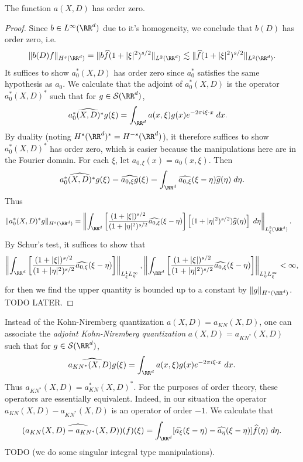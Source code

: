 \begin{theorem}
  The function $a(X,D)$ has order zero.
\end{theorem}
\begin{proof}
  Since $b \in L^\infty(\RR^d)$ due to it's homogeneity, we conclude that $b(D)$ has order zero, i.e.
  \[ \| b(D) f \|_{H^s(\RR^d)} = \| b \widehat{f} (1 + |\xi|^2)^{s/2} \|_{L^2(\RR^d)} \lesssim \| \widehat{f} (1 + |\xi|^2)^{s/2} \|_{L^2(\RR^d)}. \]
  It suffices to show $a_0^*(X,D)$ has order zero since $a_0^*$ satisfies the same hypothesis as $a_0$. We calculate that the adjoint of $a_0^*(X,D)$ is the operator $a_0^*(X,D)^*$ such that for $g \in \mathcal{S}(\RR^d)$,
  \begin{align*}
    \widehat{a_0^*(X,D)^* g}(\xi) &= \int_{\RR^d} a(x,\xi) g(x) e^{-2 \pi i \xi \cdot x}\; dx.
  \end{align*}
  By duality (noting $H^s(\RR^d)^* = H^{-s}(\RR^d)$), it therefore suffices to show $a_0^*(X,D)^*$ has order zero, which is easier because the manipulations here are in the Fourier domain. For each $\xi$, let $a_{0,\xi}(x) = a_0(x,\xi)$. Then
  \[ \widehat{a_0^*(X,D)^* g}(\xi) = \widehat{a_{0,\xi} g}(\xi) = \int_{\RR^d} \widehat{a_{0,\xi}}(\xi - \eta) \widehat{g}(\eta)\; d\eta. \]
  Thus
  \begin{align*}
    \| a_0^*(X,D)^* g \|_{H^s(\RR^d)} &= \left\| \int_{\RR^d} \left[ \frac{(1 + |\xi|)^{s/2}}{(1 + |\eta|^2)^{s/2}} \widehat{a_{0,\xi}}(\xi - \eta) \right] \left[(1 + |\eta|^2)^{s/2}) \widehat{g}(\eta)\right]\; d\eta \right\|_{L^2_\xi(\RR^d)}.
  \end{align*}
  By Schur's test, it suffices to show that
  \[ \left\| \int_{\RR^d} \left[ \frac{(1 + |\xi|)^{s/2}}{(1 + |\eta|^2)^{s/2}} \widehat{a_{0,\xi}}(\xi - \eta) \right] \right\|_{L^1_\xi L^\infty_\eta}, \left\| \int_{\RR^d} \left[ \frac{(1 + |\xi|)^{s/2}}{(1 + |\eta|^2)^{s/2}} \widehat{a_{0,\xi}}(\xi - \eta) \right] \right\|_{L^1_\eta L^\infty_\xi} < \infty, \]
  for then we find the upper quantity is bounded up to a constant by $\| g \|_{H^s(\RR^d)}$. TODO LATER.
\end{proof}

\begin{remark}
  Instead of the Kohn-Niremberg quantization $a(X,D) = a_{KN}(X,D)$, one can associate the \emph{adjoint Kohn-Niremberg quantization} $a(X,D) = a_{KN^*}(X,D)$ such that for $g \in \mathcal{S}(\RR^d)$,
  \[ \widehat{a_{KN^*}(X,D) g}(\xi) = \int_{\RR^d} a(x,\xi) g(x) e^{-2 \pi i \xi \cdot x}\; dx. \]
  Thus $a_{KN^*}(X,D) = a^*_{KN}(X,D)^*$. For the purposes of order theory, these operators are essentially equivalent. Indeed, in our situation the operator $a_{KN}(X,D) - a_{KN^*}(X,D)$ is an operator of order $-1$. We calculate that
  \[ \widehat{(a_{KN}(X,D) - a_{KN^*}(X,D))(f)}(\xi) = \int_{\RR^d} [\widehat{a_\xi}(\xi - \eta) - \widehat{a_\eta}(\xi - \eta)] \widehat{f}(\eta)\; d\eta. \]
  TODO (we do some singular integral type manipulations).
\end{remark}

